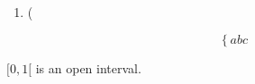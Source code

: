 \documentclass[12pt]{article}
\begin{document}
\begin{enumerate}
    \item (
\end{enumerate}

\begin{equation}
  \left\{abc\right.
\end{equation}

$[0,1[$ is an open interval.
\end{document}
